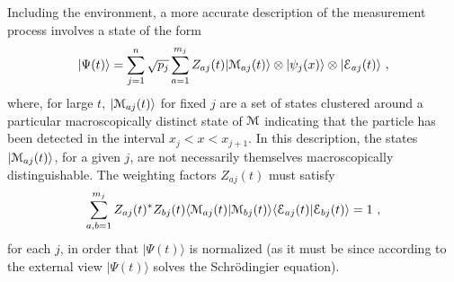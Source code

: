 \documentclass[12pt]{article}
\def\BM{{\EuScript M}}
\def\BE{{\EuScript E}}
\def\ket#1{| #1\rangle}
\def\braket#1#2{\VEV{#1 | #2}}
\def\VEV#1{\langle #1\rangle}
\newcommand{\EQ}[1]{\begin{equation}\begin{split} #1
\end{split}\end{equation}}
\begin{document}
Including the environment, a more accurate description of the measurement process involves a state of the form
\EQ{
\ket{\Psi(t)}=\sum_{j=1}^n\sqrt{p_j}\sum_{a=1}^{m_j}Z_{aj}(t)\ket{\BM_{aj}(t)}\otimes\ket{\psi_j(x)}\otimes\ket{\BE_{aj}(t)}\ ,
\label{vv5}
}
where, for large $t$, $\ket{\BM_{aj}(t)}$ for fixed $j$ are a set of states clustered around a particular macroscopically distinct state of $\BM$ indicating that the particle has been detected in the interval $x_j<x<x_{j+1}$. In this description, the states $\ket{\BM_{aj}(t)}$, for a given $j$, are not necessarily themselves macroscopically distinguishable. The weighting factors $Z_{aj}(t)$ must satisfy
\EQ{
\sum_{a,b=1}^{m_j}Z_{aj}(t)^*Z_{bj}(t)\braket{\BM_{aj}(t)}{\BM_{bj}(t)}\braket{\BE_{aj}(t)}{\BE_{bj}(t)}=1\ ,
}
for each $j$, in order that $\ket{\Psi(t)}$ is normalized (as it must be since according to the external view $\ket{\Psi(t)}$ solves the Schr\"odingier equation).
\end{document}

